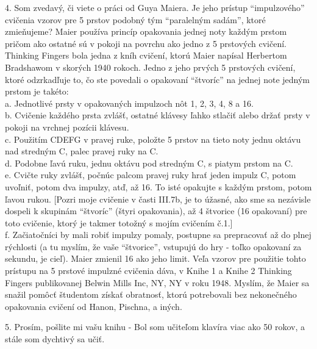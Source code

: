 4. Som zvedavý, či viete o práci od Guya Maiera. Je jeho prístup “impulzového” cvičenia vzorov pre 5 prstov podobný tým “paralelným sadám”, ktoré zmieňujeme? Maier používa princíp opakovania jednej noty každým prstom pričom ako ostatné sú v pokoji na povrchu ako jedno z 5 prstových cvičení. Thinking Fingers bola jedna z kníh cvičení, ktorú Maier napísal Herbertom Bradshawom v skorých 1940 rokoch. Jedno z jeho prvých 5 prstových cvičení, ktoré odzrkadľuje to, čo ste povedali o opakovaní “štvoríc” na jednej note jedným prstom je takéto:\\
a. Jednotlivé prsty v opakovaných impulzoch nôt 1, 2, 3, 4, 8 a 16.\\
b. Cvičenie každého prsta zvlášť, ostatné klávesy ľahko stlačiť  alebo držať prsty v pokoji na vrchnej pozícii klávesu.\\
c. Použitím CDEFG v pravej ruke, položte 5 prstov na tieto noty jednu oktávu nad stredným C, palec pravej ruky na C.\\
d. Podobne ľavú ruku, jednu oktávu pod stredným C, s piatym prstom na C.\\
e. Cvičte ruky zvlášť, počnúc palcom pravej ruky hrať jeden impulz C, potom uvoľniť, potom dva impulzy, atď, až 16. To isté opakujte s každým prstom, potom ľavou rukou.
[Pozri moje cvičenie v časti III.7b, je to úžasné, ako sme sa nezávisle dospeli k skupinám “štvoríc” (štyri opakovania), až 4 štvorice (16 opakovaní) pre toto cvičenie, ktorý je takmer totožný s mojím cvičením č.1.]\\
f. Začiatočníci by mali robiť impulzy pomaly, postupne sa prepracovať až do plnej rýchlosti (a tu myslím, že vaše “štvorice”, vstupujú do hry - toľko opakovaní za sekundu, je cieľ).
Maier zmienil 16 ako jeho limit. Veľa vzorov pre použitie tohto prístupu na 5 prstové impulzné cvičenia dáva, v Knihe 1 a Knihe 2 Thinking Fingers  publikovanej Belwin Mills Inc, NY, NY v roku 1948. Myslím, že Maier sa snažil pomôcť študentom získať obratnosť, ktorú potrebovali bez nekonečného opakovania cvičení od Hanon, Pischna, a iných. 
\medskip

5. Prosím, pošlite mi vašu knihu - Bol som učiteľom klavíra viac ako 50 rokov, a stále som dychtivý sa učiť.
\medskip

